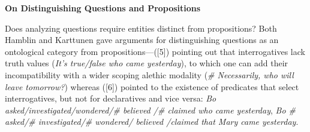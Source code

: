 \documentclass[a4wide]{article}
\title{}
\author{}
\date{}
\newcommand{\ignore}[1]{}
\begin{document}
\pagestyle{empty}

\vspace*{-8\baselineskip}

\begin{center}
{\bf \Large 
On Distinguishing Questions and Propositions}
\end{center}
\vspace*{5pt}

\ignore{ Checklist:

\begin{itemize} 
 
\item Questions \textbf{can} be conjoined and disjoined with other questions 
 
\item Questions \textbf{cannot} be conjoined or disjoined with
  propositions

\item Speech acts involving queries \textbf{can} be conjoined and
  disjoined with other queries

\item Speech acts involving assertions of propositions and queries
  \textbf{can} be conjoined and disjoined in that order

\item Questions \textbf{cannot} be conditionalized (although questions
  based on conditional propositions can be constructed)

\item Speech acts which are queries \textbf{can} be conditionalized

\item Questions \textbf{cannot} be negated (although questions based
  on negative propositions can be constructed)

\ignore{\item Speech acts which are queries (or any other speech acts)
  \textbf{cannot} be negated.  That is, \textit{Isn't he quite smart?}
  cannot mean ``I'm not asking you whether he is smart''.
 }
\end{itemize} 
}


Does analyzing questions require entities distinct from propositions?
Both Hamblin and Karttunen gave arguments for distinguishing questions
as an ontological category from propositions---([5]\ignore{\cite{hamblin58}})
pointing out that interrogatives lack truth values (\textit{It's true/false who came yesterday}), to which one
can add their incompatibility with a wider scoping alethic modality
(\textit{\# Necessarily, who will leave tomorrow?}) whereas ([6]\ignore{\cite{kartt77}})
pointed to the existence of predicates that select interrogatives, but
not for declaratives and vice
versa:
\textit{Bo asked/investigated/wondered/\# believed /\# claimed who came
yesterday},  \textit{Bo \# asked/\# investigated/\# wondered/ believed
/claimed that Mary came yesterday}.
\end{document}
